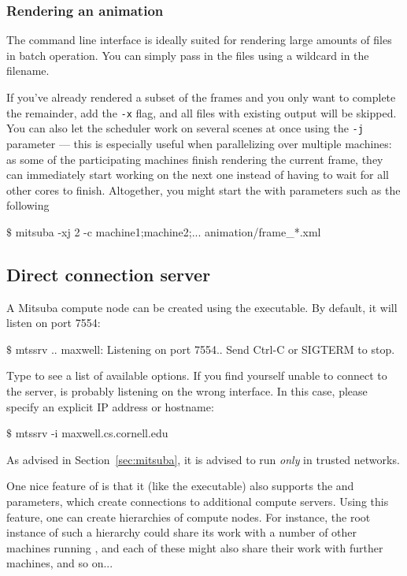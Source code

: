 \subsubsection{Rendering an animation}
The command line interface is ideally suited for rendering large amounts of files in batch
operation. You can simply pass in the files using a wildcard in the filename. 

If you've already rendered a subset of the frames and you only want to complete the remainder, 
add the \texttt{-x} flag, and all files with existing output will be skipped. You can also 
let the scheduler work on several scenes at once using the \texttt{-j} parameter --- this is 
especially useful when parallelizing over multiple machines: as some of the participating machines
finish rendering the current frame, they can immediately start working on the next one
instead of having to wait for all other cores to finish. Altogether, you
might start the with parameters such as the following
\begin{shell}
$\texttt{\$}$ mitsuba -xj 2 -c machine1;machine2;...  animation/frame_*.xml
\end{shell}
\subsection{Direct connection server}
A Mitsuba compute node can be created using the  executable. By default,
it will listen on port 7554:
\begin{shell}
$\texttt{\$}$ mtssrv
..
maxwell: Listening on port 7554.. Send Ctrl-C or SIGTERM to stop.
\end{shell}
Type  to see a list of available options.
If you find yourself unable to connect to the server,  is probably listening on
the wrong interface. In this case, please specify an explicit IP address or hostname:
\begin{shell}
$\texttt{\$}$ mtssrv -i maxwell.cs.cornell.edu
\end{shell}
As advised in Section~\ref{sec:mitsuba}, it is advised to run  \emph{only} in trusted networks.

One nice feature of  is that it (like the  executable) 
also supports the  and  parameters, which create connections 
to additional compute servers.
Using this feature, one can create hierarchies of compute nodes. For instance,
the root  instance of such a hierarchy could share its work with a 
number of other  machines running , and each of these might also 
share their work with further machines, and so on...

